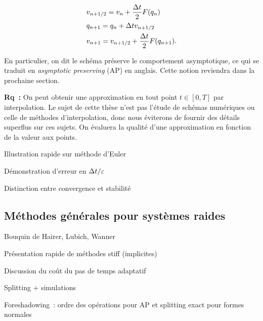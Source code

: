 \bigskip\bigskip\bigskip
{}
\vspace*{-2\bigskipamount}
\begin{align*}
&   v_{n + 1/2} = v_n + \frac{\Delta t}{2}F(q_n) \\
&   q_{n+1} = q_n + \Delta t v_{n+1/2} \\
&   v_{n+1} = v_{n+1/2} + \frac{\Delta t}{2}F(q_{n+1}) .
\end{align*}
\vspace*{-\medskipamount}


\bigskip\bigskip\bigskip
En particulier, on dit le schéma préserve le comportement asymptotique, 
ce qui se traduit en \textit{asymptotic preserving} (AP) en anglais.
Cette notion reviendra dans la prochaine section. 



\bigskip\bigskip\bigskip
\textbf{Rq~:} On peut obtenir une approximation en tout point $t \in
[0,T]$ par interpolation. Le sujet de cette thèse n'est pas l'étude de
schémas numériques ou celle de méthodes d'interpolation, donc nous 
éviterons de fournir des détails superflus sur ces sujets. On évaluera
la qualité d'une approximation en fonction de la valeur aux points. 

Illustration rapide sur méthode d'Euler

Démonstration d'erreur en $\Delta t/\varepsilon$

Distinction entre convergence et stabilité



\subsection*{Méthodes générales pour systèmes raides}

Bouquin de Hairer, Lubich, Wanner

Présentation rapide de méthodes stiff (implicites)

Discussion du coût du pas de temps adaptatif

Splitting + simulations

Foreshadowing~: ordre des opérations pour AP et splitting exact pour
formes normales